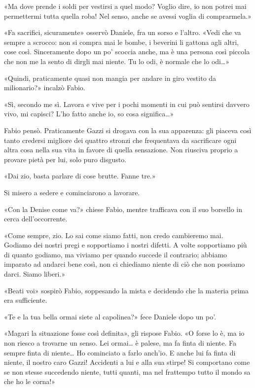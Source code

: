«Ma dove prende i soldi per vestirsi a quel modo? Voglio dire, io non potrei mai permettermi tutta quella roba! Nel senso, anche se avessi voglia di comprarmela.»

«Fa sacrifici, sicuramente» osservò Daniele, fra un sorso e l'altro. «Vedi che va sempre a scrocco: non si compra mai le bombe, i beverini li gattona agli altri, cose così. Sinceramente dopo un po' scoccia anche, ma è una persona così piccola che non me la sento di dirgli mai niente. Tu lo odi, è normale che lo odi\ldots{}»

«Quindi, praticamente quasi non mangia per andare in giro vestito da milionario?» incalzò Fabio.

«Sì, secondo me sì. Lavora e vive per i pochi momenti in cui può sentirsi davvero vivo, mi capisci? L'ho fatto anche io, so cosa significa\ldots{}»

Fabio pensò. Praticamente Gazzi si drogava con la sua apparenza: gli piaceva così tanto credersi migliore dei quattro stronzi che frequentava da sacrificare ogni altra cosa nella sua vita in favore di quella sensazione. Non riusciva proprio a provare pietà per lui, solo puro disgusto.

«Dai zio, basta parlare di cose brutte. Fanne tre.»

Si misero a sedere e cominciarono a lavorare.

«Con la Denise come va?» chiese Fabio, mentre trafficava con il suo borsello in cerca dell'occorrente.

«Come sempre, zio. Lo sai come siamo fatti, non credo cambieremo mai. Godiamo dei nostri pregi e sopportiamo i nostri difetti. A volte sopportiamo più di quanto godiamo, ma viviamo per quando succede il contrario; abbiamo imparato ad andarci bene così, non ci chiediamo niente di ciò che non possiamo darci. Siamo liberi.»

«Beati voi» sospirò Fabio, soppesando la mista e decidendo che la materia prima era sufficiente.

«Te e la tua bella ormai siete al capolinea?» fece Daniele dopo un po'.

«Magari la situazione fosse così definita», gli rispose Fabio. «O forse lo è, ma io non riesco a trovarne un senso. Lei ormai\ldots{} è palese, ma fa finta di niente. Fa sempre finta di niente\ldots{} Ho cominciato a farlo anch'io. E anche lui fa finta di niente, il nostro caro Gazzi! Accidenti a lui e alla sua stirpe! Si comportano come se non stesse succedendo niente, tutti quanti, ma nel frattempo tutto il mondo sa che ho le corna!»


